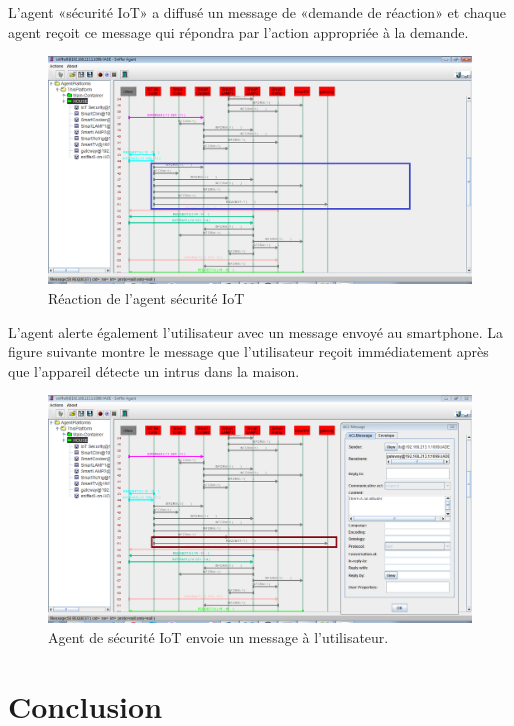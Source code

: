 L'agent «sécurité IoT» a diffusé un message de «demande de réaction» et chaque agent reçoit ce message qui répondra par l'action appropriée à la demande.
	\begin{figure}[H]
    \centering
    \includegraphics[scale=0.5]{chap1/fc29.png}
    \caption{Réaction de l'agent sécurité IoT}
    \label{fc29}
\end{figure}

L'agent alerte également l'utilisateur avec un message envoyé au smartphone. La figure suivante montre le message que l'utilisateur reçoit immédiatement après que l'appareil détecte un intrus dans la maison.
		\begin{figure}[H]
    \centering
    \includegraphics[scale=0.5]{chap1/fc30.png}
    \caption{Agent de sécurité IoT envoie un message à l'utilisateur.}
    \label{fc30}
\end{figure}
\section{Conclusion}

